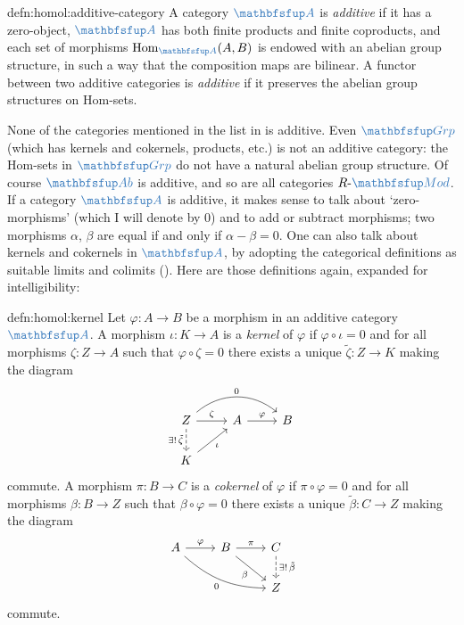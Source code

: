 \begin{defn}{}{defn:homol:additive-category}
  A category $\categ{A}$ is \emph{additive} if it has a zero-object,
  $\categ{A}$ has both finite products and finite coproducts, and each
  set of morphisms $\mathrm{Hom}_{\categ{A}}(A, B)$ is endowed with an
  abelian group structure, in such a way that the composition maps are
  bilinear. A functor between two additive categories is
  \emph{additive} if it preserves the abelian group structures on
  Hom-sets.
\end{defn}
None of the categories mentioned in the list in
is additive.  Even $\categ{Grp}$ (which has kernels and cokernels,
products, etc.)  is not an additive category: the Hom-sets in
$\categ{Grp}$ do not have a natural abelian group structure. Of course
$\categ{Ab}$ is additive, and so are all categories
$R\text{-}\categ{Mod}$.  If a category $\categ{A}$ is additive, it
makes sense to talk about `zero-morphisms' (which I will denote by
$0$) and to add or subtract morphisms; two morphisms $\alpha$, $\beta$
are equal if and only if $\alpha - \beta = 0$. One can also talk about
kernels and cokernels in $\categ{A}$, by adopting the categorical
definitions as suitable limits and colimits
(). Here are those definitions again, expanded
for intelligibility:
\begin{defn}{}{defn:homol:kernel}
  Let $\varphi : A \to B$ be a morphism in an additive category
  $\categ{A}$. A morphism $\iota : K \to A$ is a \emph{kernel} of
  $\varphi$ if $\varphi \circ \iota = 0$ and for all morphisms
  $\zeta : Z \to A$ such that $\varphi \circ \zeta = 0$ there exists a
  unique $\tilde\zeta : Z \to K$ making the diagram
  \[\begin{tikzcd}
      Z \arrow[rr, "0", bend left=40] \arrow[r, "\zeta"] \arrow[d,
      dashed, "\exists! \, \tilde\zeta"'] &
      A \arrow[r, "\varphi"] & B \\
      K \arrow[ur, "\iota"']
    \end{tikzcd}\] commute. A morphism $\pi : B \to C$ is a
  \emph{cokernel} of $\varphi$ if $\pi \circ \varphi = 0$ and for all
  morphisms $\beta : B \to Z$ such that $\beta \circ \varphi = 0$
  there exists a unique $\tilde\beta : C \to Z$ making the diagram
  \[\begin{tikzcd}
      A \arrow[r, "\varphi"] \arrow[rrd, "0"', bend right=20] & B
      \arrow[r, "\pi"] \arrow[dr, "\beta"'] &
      C \arrow[d, dashed, "\exists! \, \tilde\beta"] \\
      & & Z
    \end{tikzcd}\] commute.
\end{defn}

